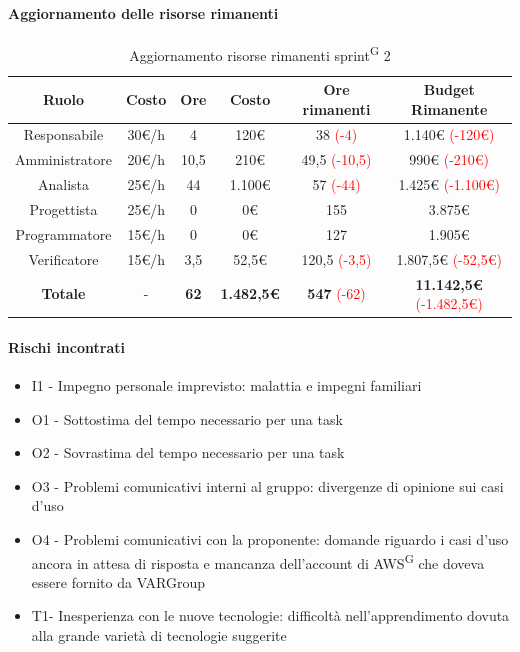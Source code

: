 \documentclass[a4paper, 11pt]{article}
\newcommand{\subsubsubsection}[1]{\paragraph{#1}}
\renewcommand{\arraystretch}{1.4} %
\begin{document}
\subsubsubsection{Aggiornamento delle risorse rimanenti}
\begin{table}[H]
    \centering
    \renewcommand{\arraystretch}{1.5}
    
    \begin{tabular}{|c|c|c|c|c|c|}
        \hline
        \textcolor{AccentColor}{\textbf{Ruolo}} &
        \textcolor{AccentColor}{\textbf{Costo}} &
        \textcolor{AccentColor}{\textbf{Ore}} &
        \textcolor{AccentColor}{\textbf{Costo}} &
        \textcolor{AccentColor}{\textbf{Ore rimanenti}} &
        \textcolor{AccentColor}{\textbf{Budget Rimanente}} \\ \hline
        
        Responsabile & 30€/h & 4 & 120€ & 38 \textcolor{red}{(-4)} & 1.140€ \textcolor{red}{(-120€)}\\ \hline
        
        Amministratore & 20€/h & 10,5 & 210€ & 49,5 \textcolor{red}{(-10,5)} & 990€ \textcolor{red}{(-210€)} \\ \hline
        
        Analista & 25€/h & 44 & 1.100€ & 57 \textcolor{red}{(-44)} & 1.425€ \textcolor{red}{(-1.100€)}\\ \hline
        
        Progettista & 25€/h & 0 & 0€ & 155 & 3.875€ \\ \hline
        
        Programmatore & 15€/h & 0 & 0€ & 127 & 1.905€ \\ \hline
        
        Verificatore & 15€/h & 3,5 & 52,5€ & 120,5 \textcolor{red}{(-3,5)}& 1.807,5€ \textcolor{red}{(-52,5€)} \\ \hline
        
        \textbf{Totale} & - & \textbf{62} & \textbf{1.482,5€} & \textbf{547} \textcolor{red}{(-62)} & \textbf{11.142,5€} \textcolor{red}{(-1.482,5€)}\\ \hline
    \end{tabular}
    \caption{Aggiornamento risorse rimanenti sprint\textsuperscript{G} 2}
\end{table}
\subsubsubsection{Rischi incontrati}
\begin{itemize}
  \item I1 - Impegno personale imprevisto: malattia e impegni familiari
  \item O1 - Sottostima del tempo necessario per una task
  \item O2 - Sovrastima del tempo necessario per una task
  \item O3 - Problemi comunicativi interni al gruppo: divergenze di opinione sui casi d'uso
  \item O4 - Problemi comunicativi con la proponente: domande riguardo i casi d'uso ancora in attesa di risposta
   e mancanza dell'account di AWS\textsuperscript{G} che doveva essere fornito da VARGroup
  \item T1- Inesperienza con le nuove tecnologie: difficoltà nell'apprendimento dovuta alla grande varietà di tecnologie suggerite
\end{itemize}
\end{document}
